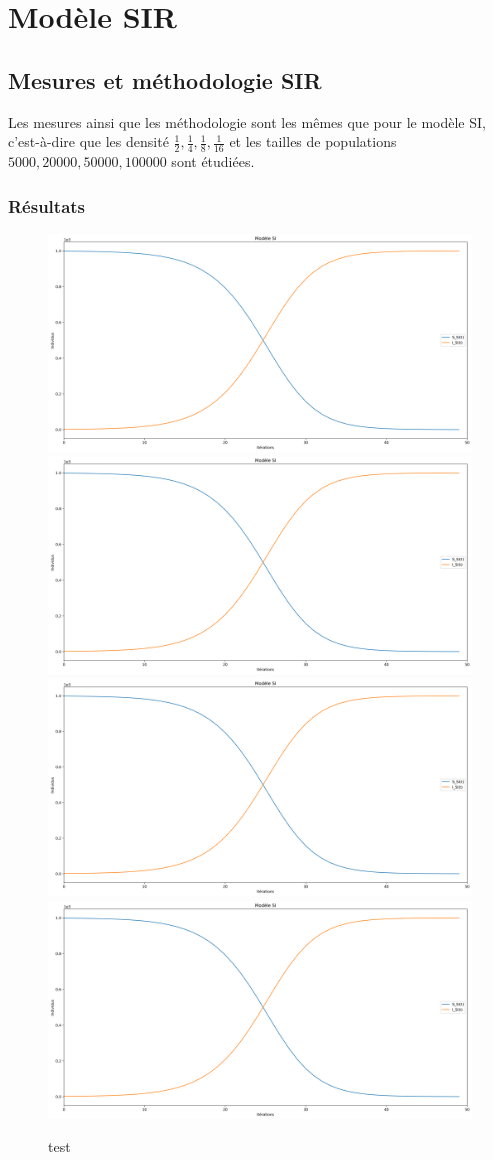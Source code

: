 \chapter{Modèle SIR} \label{ch:intro}

\section{Mesures et méthodologie SIR}

Les mesures ainsi que les méthodologie sont les mêmes que pour le modèle SI, c'est-à-dire que les densité $\frac{1}{2},\frac{1}{4},\frac{1}{8},\frac{1}{16}$ et les tailles de populations $5000,20000,50000,100000$ sont étudiées.

\subsection{Résultats}

\begin{figure}[h]
	\centering
	\captionsetup{justification=centering}
	\includegraphics[width=.4\textwidth]{Images/SI_exemple.png}
	\includegraphics[width=.4\textwidth]{Images/SI_exemple.png}
	\includegraphics[width=.4\textwidth]{Images/SI_exemple.png}
	\includegraphics[width=.4\textwidth]{Images/SI_exemple.png}
	\caption{test}
\end{figure}
